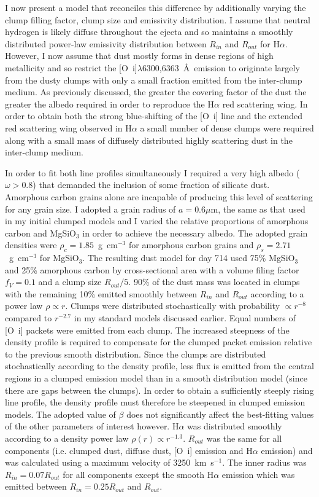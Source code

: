 I now present a model that reconciles this difference by additionally varying the clump filling factor, clump size and emissivity distribution.  I assume that neutral hydrogen is likely diffuse throughout the ejecta and so maintains a smoothly distributed power-law emissivity distribution between $R_{in}$ and $R_{out}$ for H$\alpha$.  However, I now assume that dust mostly forms in dense regions of high metallicity and so restrict the [O~{\sc i}]$\lambda$6300,6363~\AA\ emission to originate largely from the dusty clumps with only a small fraction emitted from the inter-clump medium.  As previously discussed, the greater the covering factor of the dust the greater the albedo required in order to reproduce the H$\alpha$ red scattering wing. In order to obtain both the strong blue-shifting of the [O~{\sc i}] line and the extended red scattering wing observed in H$\alpha$ a small number of dense clumps were required along with a small mass of diffusely distributed highly scattering dust in the inter-clump medium.


In order to fit both line profiles simultaneously I required a very high albedo ($\omega > 0.8$) that demanded the inclusion of some fraction of silicate dust. Amorphous carbon grains alone are incapable of producing this level of scattering for any grain size.  I adopted a grain radius of $a=0.6\mu$m, the same as that used in my initial clumped models and I varied the relative proportions of amorphous carbon and MgSiO$_3$ in order to achieve the necessary albedo.  The adopted grain densities were $\rho_c=1.85$~g~cm$^{-3}$ for amorphous carbon grains and $\rho_s = 2.71$~g~cm$^{-3}$ for MgSiO$_3$.  The resulting dust model for day 714 used 75\% MgSiO$_3$ and 25\% amorphous carbon by cross-sectional area with a volume filing factor $f_V=0.1$ and a clump size $R_{out}/5$.  90\% of the dust mass was located in clumps with the remaining 10\% emitted smoothly between $R_{in}$ and $R_{out}$ according to a power law $\rho \propto r$. Clumps were distributed stochastically with probability $\propto r^{-8}$ compared to $r^{-2.7}$ in my standard models discussed earlier. Equal numbers of [O~{\sc i}] packets were emitted from each clump. The increased steepness of the density profile is required to compensate for the clumped packet emission relative to the previous smooth distribution.  Since the clumps are distributed stochastically according to the density profile, less flux is emitted from the central regions in a clumped emission model than in a smooth distribution model (since there are gaps between the clumps).  In order to obtain a sufficiently steeply rising line profile, the density profile must therefore be steepened in clumped emission models. The adopted value of $\beta$ does not significantly affect the best-fitting values of the other parameters of interest however.  H$\alpha$ was distributed smoothly according to a density power law $\rho(r) \propto r^{-1.3}$.  $R_{out}$ was the same for all components (i.e. clumped dust, diffuse dust, [O~{\sc i}] emission and H$\alpha$ emission) and was calculated using a maximum velocity of 3250~km~s$^{-1}$.  The inner radius was $R_{in} = 0.07 R_{out}$ for all components except the smooth H$\alpha$ emission which was emitted between $R_{in}=0.25R_{out}$ and $R_{out}$.  


